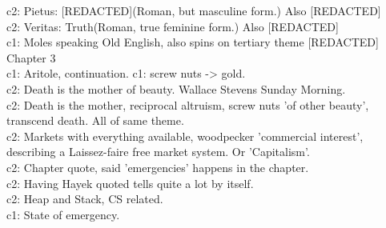 c2: Pietus: [REDACTED](Roman, but masculine form.) Also [REDACTED]\\
c2: Veritas: Truth(Roman, true feminine form.) Also [REDACTED]\\
c1: Moles speaking Old English, also spins on tertiary theme [REDACTED]\\
Chapter 3\\[0.1cm]
c1: Aritole, continuation.
c1: screw nuts -> gold.\\
c2: Death is the mother of beauty. Wallace Stevens Sunday Morning.\\
c2: Death is the mother, reciprocal altruism, screw nuts 'of other beauty', transcend death. All of same theme.\\
c2: Markets with everything available, woodpecker 'commercial interest', describing a Laissez-faire free market system. Or 'Capitalism'.\\
c2: Chapter quote, said 'emergencies' happens in the chapter.\\
c2: Having Hayek quoted tells quite a lot by itself.\\
c2: Heap and Stack, CS related.\\
c1: State of emergency.\\
